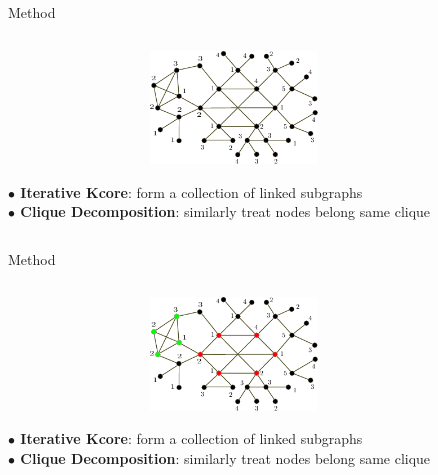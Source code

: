 \documentclass{beamer}
\begin{document}
\begin{frame}[t]{Method}
\vspace{-1cm}
\begin{columns}[t] %
\begin{column}[t]{.5\textwidth}
	\begin{figure}
	  \includegraphics[width=1.0\textwidth, height=3.0cm]{images/Decomposition_0.pdf}
	\end{figure} 
	\textbf{$\bullet$ Iterative Kcore}: form a collection of linked subgraphs \vspace{.5em}\\
	\textbf{$\bullet$ Clique Decomposition}: similarly treat nodes belong same clique \vspace{.5em}\\ 
	
\end{column}%
\begin{column}{.5\textwidth}


\end{column}%
\end{columns}
\end{frame}
\begin{frame}[t]{Method}
\vspace{-1cm}
\begin{columns}[t] %
\begin{column}[t]{.5\textwidth}
	\begin{figure}
	  \includegraphics[width=1.0\textwidth, height=3.0cm]{images/Decomposition_1.pdf}
	\end{figure} 

	\textbf{$\bullet$ Iterative Kcore}: form a collection of linked subgraphs \vspace{.5em}\\
	\textbf{$\bullet$ Clique Decomposition}: similarly treat nodes belong same clique \vspace{.5em}\\ 
	
\end{column}%
\begin{column}{.5\textwidth}

\end{column}%
\end{columns}
\end{frame}
\end{document}
